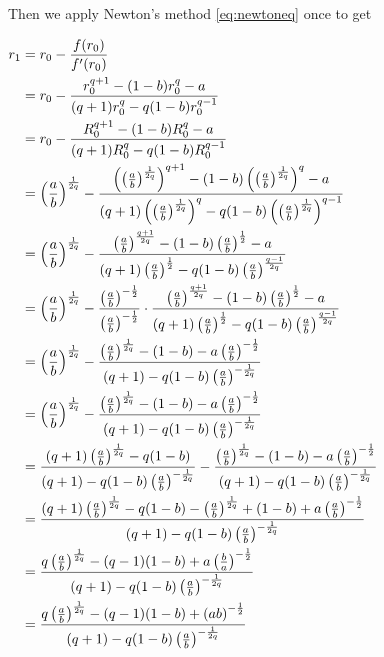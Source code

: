 \begin{result}
\begin{pf}
Then we apply Newton's method \ref{eq:newtoneq} once to get

$\begin{aligned}
r_1 
&= r_0 - \frac{f(r_0)}{f'(r_0)} \\
&= r_0 - \frac{r_0^{q+1} - (1-b)r_0^q - a}{(q+1)r_0^q - q(1-b)r_0^{q-1}} \\
&= r_0 - \frac{R_0^{q+1} - (1-b)R_0^q - a}{(q+1)R_0^q - q(1-b)R_0^{q-1}} \\
&= \left(\frac{a}{b}\right)^{\frac1{2q}} - \frac{\left(\left(\frac{a}{b}\right)^{\frac1{2q}}\right)^{q+1} - (1-b)\left(\left(\frac{a}{b}\right)^{\frac1{2q}}\right)^q - a}{(q+1)\left(\left(\frac{a}{b}\right)^{\frac1{2q}}\right)^q - q(1-b)\left(\left(\frac{a}{b}\right)^{\frac1{2q}}\right)^{q-1}} \\
&= \left(\frac{a}{b}\right)^{\frac1{2q}} - \frac{\left(\frac{a}{b}\right)^{\frac{q+1}{2q}} - (1-b)\left(\frac{a}{b}\right)^{\frac12} - a}{(q+1)\left(\frac{a}{b}\right)^{\frac12} - q(1-b)\left(\frac{a}{b}\right)^{\frac{q-1}{2q}}}\\
&= \left(\frac{a}{b}\right)^{\frac1{2q}} - \frac{\left(\frac{a}{b}\right)^{-\frac12}}{\left(\frac{a}{b}\right)^{-\frac12}} \cdot
\frac{\left(\frac{a}{b}\right)^{\frac{q+1}{2q}} - (1-b)\left(\frac{a}{b}\right)^{\frac12} - a}{(q+1)\left(\frac{a}{b}\right)^{\frac12} - q(1-b)\left(\frac{a}{b}\right)^{\frac{q-1}{2q}}}\\
&= \left(\frac{a}{b}\right)^{\frac1{2q}} - \frac{\left(\frac{a}{b}\right)^{\frac1{2q}} - (1-b) - a\left(\frac{a}{b}\right)^{-\frac12}}{(q+1) - q(1-b)\left(\frac{a}{b}\right)^{-\frac{1}{2q}}}\\
&= \left(\frac{a}{b}\right)^{\frac1{2q}} - \frac{\left(\frac{a}{b}\right)^{\frac1{2q}} - (1-b) - a\left(\frac{a}{b}\right)^{-\frac12}}{(q+1) - q(1-b)\left(\frac{a}{b}\right)^{-\frac{1}{2q}}}\\
&= \frac{(q+1)\left(\frac{a}{b}\right)^{\frac{1}{2q}} - q(1-b)}{(q+1) - q(1-b)\left(\frac{a}{b}\right)^{-\frac{1}{2q}}} - \frac{\left(\frac{a}{b}\right)^{\frac1{2q}} - (1-b) - a\left(\frac{a}{b}\right)^{-\frac12}}{(q+1) - q(1-b)\left(\frac{a}{b}\right)^{-\frac{1}{2q}}}\\
&= \frac{(q+1)\left(\frac{a}{b}\right)^{\frac{1}{2q}} - q(1-b) - \left(\frac{a}{b}\right)^{\frac1{2q}} + (1-b) + a\left(\frac{a}{b}\right)^{-\frac12}}{(q+1) - q(1-b)\left(\frac{a}{b}\right)^{-\frac{1}{2q}}}\\
&= \frac{q\left(\frac{a}{b}\right)^{\frac{1}{2q}} - (q-1)(1-b) + a\left(\frac{b}{a}\right)^{-\frac12}}{(q+1) - q(1-b)\left(\frac{a}{b}\right)^{-\frac{1}{2q}}}\\
&= \frac{q\left(\frac{a}{b}\right)^{\frac{1}{2q}} - (q-1)(1-b) + \left(ab\right)^{-\frac12}}{(q+1) - q(1-b)\left(\frac{a}{b}\right)^{-\frac{1}{2q}}}\\
\end{aligned}$
\end{pf}
\end{result}

